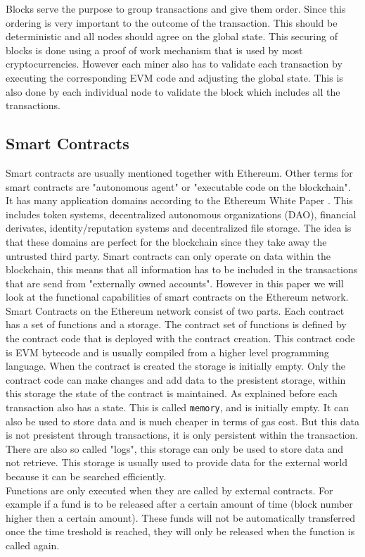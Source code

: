 \documentclass[a4paper]{article}
\begin{document}
Blocks serve the purpose to group transactions and give them order. Since this ordering is very important to the outcome of the transaction. This should be deterministic and all nodes should agree on the global state. This securing of blocks is done using a proof of work mechanism that is used by most cryptocurrencies. However each miner also has to validate each transaction by executing the corresponding EVM code and adjusting the global state. This is also done by each individual node to validate the block which includes all the transactions.

\subsection{Smart Contracts}
Smart contracts are usually mentioned together with Ethereum. Other terms for smart contracts are "autonomous agent" or "executable code on the blockchain". It has many application domains according to the Ethereum White Paper \cite{buterin2013ethereum}. This includes token systems, decentralized autonomous organizations (DAO), financial derivates, identity/reputation systems and decentralized file storage. The idea is that these domains are perfect for the blockchain since they take away the untrusted third party. Smart contracts can only operate on data within the blockchain, this means that all information has to be included in the transactions that are send from "externally owned accounts". However in this paper we will look at the functional capabilities of smart contracts on the Ethereum network. \\ 
Smart Contracts on the Ethereum network consist of two parts. Each contract has a set of functions and a storage. The contract set of functions is defined by the contract code that is deployed with the contract creation. This contract code is EVM bytecode and is usually compiled from a higher level programming language. When the contract is created the storage is initially empty. Only the contract code can make changes and add data to the presistent storage, within this storage the state of the contract is maintained. As explained before each transaction also has a state. This is called \texttt{memory}, and is initially empty. It can also be used to store data and is much cheaper in terms of gas cost. But this data is not presistent through transactions, it is only persistent within the transaction. There are also so called "logs", this storage can only be used to store data and not retrieve. This storage is usually used to provide data for the external world because it can be searched efficiently.\\
Functions are only executed when they are called by external contracts. For example if a fund is to be released after a certain amount of time (block number higher then a certain amount). These funds will not be automatically transferred once the time treshold is reached, they will only be released when the function is called again.\\
\end{document}
